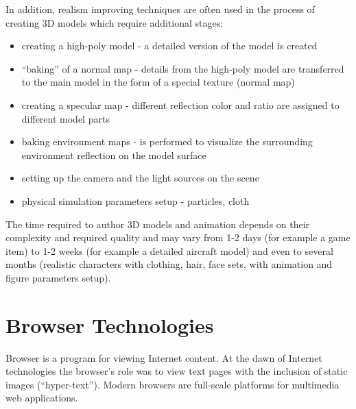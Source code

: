 \documentclass[a4paper,12pt,oneside]{sphinxmanual}
\begin{document}
In addition, realism improving techniques are often used in the process of creating 3D models which require additional stages:
\begin{itemize}
\item {} 
creating a high-poly model - a detailed version of the model is created

\item {} 
``baking'' of a normal map - details from the high-poly model are transferred to the main model in the form of a special texture (normal map)

\item {} 
creating a specular map - different reflection color and ratio are assigned to different model parts

\item {} 
baking environment maps - is performed to visualize the surrounding environment reflection on the model surface

\item {} 
setting up the camera and the light sources on the scene

\item {} 
physical simulation parameters setup - particles, cloth

\end{itemize}

The time required to author 3D models and animation depends on their complexity and required quality and may vary from 1-2 days (for example a game item) to 1-2 weeks (for example a detailed aircraft model) and even to several months (realistic characters with clothing, hair, face sets, with animation and figure parameters setup).


\section{Browser Technologies}
\label{about:id10}\label{about:index-8}\label{about:about-browser-tech}
Browser is a program for viewing Internet content. At the dawn of Internet technologies the browser's role was to view text pages with the inclusion of static images (``hyper-text''). Modern browsers are full-scale platforms for multimedia web applications.
\end{document}
